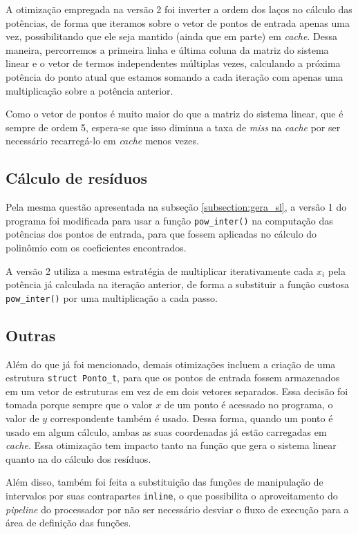 \documentclass[a4paper, 11pt]{article}
\begin{document}
A otimização empregada na versão 2 foi inverter a ordem dos laços no cálculo
das potências, de forma que iteramos sobre o vetor de pontos de entrada apenas
uma vez, possibilitando que ele seja mantido (ainda que em parte) em
\textit{cache}. Dessa maneira, percorremos a primeira linha e última coluna da
matriz do sistema linear e o vetor de termos independentes múltiplas vezes,
calculando a próxima potência do ponto atual que estamos somando a cada
iteração com apenas uma multiplicação sobre a potência anterior.

Como o vetor de pontos é muito maior do que a matriz do sistema linear, que é
sempre de ordem 5, espera-se que isso diminua a taxa de \textit{miss} na
\textit{cache} por ser necessário recarregá-lo em \textit{cache} menos vezes.

\subsection{Cálculo de resíduos}
Pela mesma questão apresentada na subseção \ref{subsection:gera_sl}, a versão
1 do programa foi modificada para usar a função \texttt{pow\_inter()} na
computação das potências dos pontos de entrada, para que fossem aplicadas no
cálculo do polinômio com os coeficientes encontrados.

A versão 2 utiliza a mesma estratégia de multiplicar iterativamente cada $x_i$
pela potência já calculada na iteração anterior, de forma a substituir a
função custosa \texttt{pow\_inter()} por uma multiplicação a cada passo.

\subsection{Outras}
Além do que já foi mencionado, demais otimizações incluem a criação de uma
estrutura \texttt{struct Ponto\_t}, para que os pontos de entrada fossem
armazenados em um vetor de estruturas em vez de em dois vetores separados.
Essa decisão foi tomada porque sempre que o valor $x$ de um ponto é acessado
no programa, o valor de $y$ correspondente também é usado. Dessa forma, quando
um ponto é usado em algum cálculo, ambas as suas coordenadas já estão carregadas
em \textit{cache}. Essa otimização tem impacto tanto na função que gera o
sistema linear quanto na do cálculo dos resíduos.

Além disso, também foi feita a substituição das funções de manipulação de
intervalos por suas contrapartes \texttt{inline}, o que possibilita o
aproveitamento do \textit{pipeline} do processador por não ser necessário
desviar o fluxo de execução para a área de definição das funções.
\end{document}
